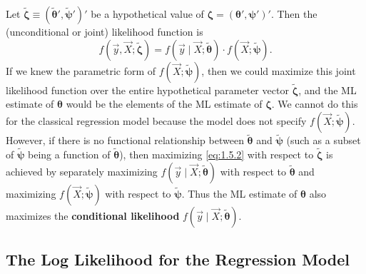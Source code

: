 Let $\tilde{\bm{\zeta}} \equiv (\tilde{\bm{\theta}}', \tilde{\bm{\psi}}')'$ be a hypothetical
value of $\bm{\zeta} = (\bm{\theta}', \bm{\psi}')'$.  Then the (unconditional or joint)
likelihood function is
%
\begin{equation}
  f(\vec{y}, \vec{X}; \tilde{\bm{\zeta}})
    = f(\vec{y} \mid \vec{X}; \tilde{\bm{\theta}})
      \cdot f(\vec{X}; \tilde{\bm{\psi}}).
  \label{eq:1.5.2}
\end{equation}
%
If we knew the parametric form of $f(\vec{X}; \tilde{\bm{\psi}})$, then we could maximize
this joint likelihood function over the entire hypothetical parameter vector
$\tilde{\bm{\zeta}}$, and the ML estimate of $\bm{\theta}$ would be the elements of the ML
estimate of $\bm{\zeta}$.  We cannot do this for the classical regression model because the
model does not specify $f(\vec{X}; \tilde{\bm{\psi}})$.  However, if there is no functional
relationship between $\tilde{\bm{\theta}}$ and $\tilde{\bm{\psi}}$ (such as a subset of
$\tilde{\bm{\psi}}$ being a function of $\tilde{\bm{\theta}}$), then maximizing
\eqref{eq:1.5.2} with respect to $\tilde{\bm{\zeta}}$ is achieved by separately maximizing
$f(\vec{y} \mid \vec{X}; \tilde{\bm{\theta}})$ with respect to $\tilde{\bm{\theta}}$ and
maximizing $f(\vec{X}; \tilde{\bm{\psi}})$ with respect to $\tilde{\bm{\psi}}$.  Thus the ML
estimate of $\bm{\theta}$ also maximizes the \textbf{conditional likelihood}
$f(\vec{y} \mid \vec{X}; \tilde{\bm{\theta}})$.

\subsection*{The Log Likelihood for the Regression Model}

